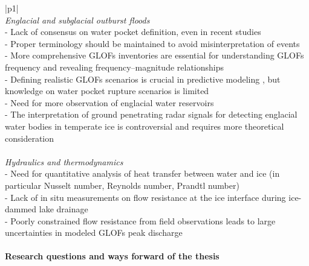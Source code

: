 \begin{longtable}{ |p{}| }
\\
\textit{Englacial and subglacial outburst floods}   \\
\hline
- Lack of consensus on water pocket definition, even in recent studies {\citep{Lutzow&al2023,Zhang&al2024}} \\
- Proper terminology should be maintained to avoid misinterpretation of events {\citep{Emmer&al2022}} \\
- More comprehensive GLOFs inventories are essential for understanding GLOFs frequency and revealing frequency–magnitude relationships {\citep{Veh&al2022,Emmer&al2022}} \\
- Defining realistic GLOFs scenarios is crucial in predictive modeling {\citep{Emmer&al2022,Zhang&al2024}}, but knowledge on water pocket rupture scenarios is limited {\citep{Haeberli1983}} \\
- Need for more observation of englacial water reservoirs {\citep{Haeberli1983}} \\
- The interpretation of ground penetrating radar signals for detecting englacial water bodies in temperate ice is controversial and requires more theoretical consideration {\citep{Murray&al2000,Brown&al2009}} \\
\\
\textit{Hydraulics and thermodynamics}\\
\hline
- Need for quantitative analysis of heat transfer between water and ice (in particular Nusselt number, Reynolds number, Prandtl number) {\citep{Clarke2003,Roberts2005,Bjornsson2010,Sommers&Rajaram2020}} \\
- Lack of in situ measurements on flow resistance at the ice interface during ice-dammed lake drainage {\citep{Clarke2003,Werder&al2010,Vincent&al2010,Kingslake&al2015,Gleason&al2016}} \\
- Poorly constrained flow resistance from field observations leads to large uncertainties in modeled GLOFs peak discharge {\citep{Werder&al2010}} \\
\\
\hline
\textbf{Research questions and ways forward of the thesis}  \\

\end{longtable}
